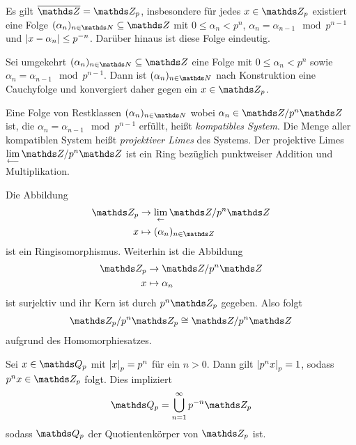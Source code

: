 \begin{cor}
Es gilt $\overline{\Z}=\Z_p$, insbesondere für jedes $x \in \Z_p$ existiert eine Folge
$(\alpha_n)_{n\in \N}\subseteq \Z$ mit $0 \leq \alpha_n<p^n$, $\alpha_n=\alpha_{n-1} \mod p^{n-1}$ und $\left\vert x-\alpha_n\right\vert\leq p^{-n}$.
Darüber hinaus ist diese Folge eindeutig.
\end{cor}

Sei umgekehrt $(\alpha_n)_{n \in \N}\subseteq \Z$ eine Folge mit $0\leq \alpha_n <p^n$ sowie $\alpha_n=\alpha_{n-1} \mod p^{n-1}$.
Dann ist $(\alpha_n)_{n\in \N}$ nach Konstruktion eine Cauchyfolge und konvergiert daher gegen ein $x\in \Z_p$.

\begin{defi}
Eine Folge von Restklassen $(\alpha_n)_{n\in \N}$ wobei $\alpha_n \in \Z / p^n\Z$ ist, die $\alpha_n=\alpha_{n-1} \mod p^{n-1}$ erfüllt, heißt \emph{kompatibles System}.
Die Menge aller kompatiblen System heißt \emph{projektiver Limes} des Systems.
Der projektive Limes $\lim\limits_{\longleftarrow} \Z /p^n\Z$ ist ein Ring bezüglich punktweiser Addition und Multiplikation.
\end{defi}

\begin{thm}
Die Abbildung
\begin{align*}
\Z_p &\to \lim_{\leftarrow} \Z/p^n\Z\\
x &\mapsto (\alpha_n)_{n\in \Z}
\end{align*}
ist ein Ringisomorphismus.
Weiterhin ist die Abbildung
\begin{align*}
\Z_p &\to \Z /p^n \Z\\
x &\mapsto \alpha_n
\end{align*}
ist surjektiv und ihr Kern ist durch $p^n\Z_p$ gegeben.
Also folgt
\begin{align*}
\Z_p /p^n \Z_p \cong \Z /p^n \Z
\end{align*}
aufgrund des Homomorphiesatzes.
\end{thm}

\begin{lem}
Sei $x\in \Q_p$ mit $\left\vert x\right\vert_p=p^n$ für ein $n>0$.
Dann gilt $\left\vert p^n x\right\vert_p=1$, sodass $p^nx\in \Z_p$ folgt.
Dies impliziert
\begin{align*}
\Q_p=\bigcup_{n=1}^\infty p^{-n}\Z_p
\end{align*}
sodass $\Q_p$ der Quotientenkörper von $\Z_p$ ist.
\end{lem}

